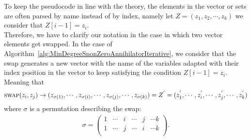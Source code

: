 \documentclass[11pt]{llncs}
\begin{document}
\begin{remark}\label{rem:permutationClarification}
    To keep the pseudocode in line with the theory, the elements in the vector or sets are often parsed by name instead of by index, namely let $Z = (z_1, z_2, \cdots, z_k)$ we consider that $Z[i-1] = z_i$.\\
    Therefore, we have to clarify our notation in the case in which two vector elements get swapped. In the case of Algorithm~\ref{alg:MinDegreeSnonZeroAnnihilatorIterative}, we consider that the swap generates a new vector with the name of the variables adapted with their index position in the vector to keep satisfying the condition $Z[i-1] = z_{i}$. Meaning that 
    \begin{align*}
        \mbox{\textsc{swap}}(z_i, z_j) \rightarrow (z_{\sigma(1)}, \cdots, z_{\sigma(i)}, \cdots, z_{\sigma(j)}, \cdots, z_{\sigma(k)}) = Z^{'} = (z^{'}_1, \cdots, z^{'}_i, \cdots, z^{'}_j, \cdots, z^{'}_k)
    \end{align*}
    where $\sigma$ is a permutation describing the swap:
    \begin{align*}
        \sigma = \begin{pmatrix}
            1 & \cdots & i & \cdots & j & \cdots k\\
            1 & \cdots & j & \cdots & i & \cdots k\\
        \end{pmatrix}.
    \end{align*}
\end{remark}
\end{document}
